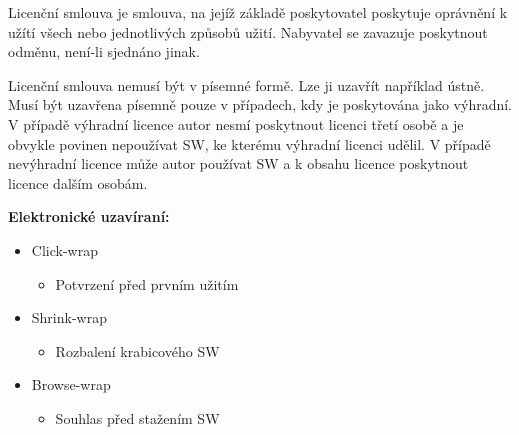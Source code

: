 Licenční smlouva je smlouva, na jejíž základě poskytovatel poskytuje oprávnění k užítí všech nebo jednotlivých způsobů užití. Nabyvatel se zavazuje poskytnout odměnu, není-li sjednáno jinak. 

Licenční smlouva nemusí být v písemné formě. Lze ji uzavřít například ústně. Musí být uzavřena písemně pouze v případech, kdy je poskytována jako výhradní. V případě výhradní licence autor nesmí poskytnout licenci třetí osobě a je obvykle povinen nepoužívat SW, ke kterému výhradní licenci udělil. V případě nevýhradní licence může autor používat SW a k obsahu licence poskytnout licence dalším osobám. 
\newline

\noindent\textbf{Elektronické uzavíraní:}
\begin{itemize}[noitemsep]
    \item Click-wrap
    \begin{itemize}[noitemsep]
        \item Potvrzení před prvním užitím
    \end{itemize}
    \item Shrink-wrap
    \begin{itemize}[noitemsep]
        \item Rozbalení krabicového SW
    \end{itemize}
    \item Browse-wrap
    \begin{itemize}[noitemsep]
        \item Souhlas před stažením SW
    \end{itemize}
\end{itemize}

